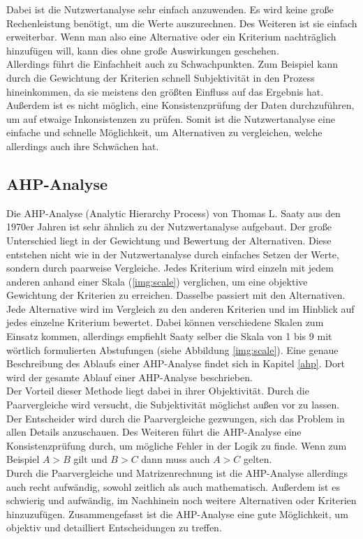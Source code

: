 Dabei ist die Nutzwertanalyse sehr einfach anzuwenden. Es wird keine große Rechenleistung benötigt, um die Werte auszurechnen. Des Weiteren ist sie einfach erweiterbar. Wenn man also eine Alternative oder ein Kriterium nachträglich hinzufügen will, kann dies ohne große Auswirkungen geschehen.\autocite[Vgl.][S.119]{Fink.2006}\\
Allerdings führt die Einfachheit auch zu Schwachpunkten. Zum Beispiel kann durch die Gewichtung der Kriterien schnell Subjektivität in den Prozess hineinkommen, da sie meistens den größten Einfluss auf das Ergebnis hat. Außerdem ist es nicht möglich, eine Konsistenzprüfung der Daten durchzuführen, um auf etwaige Inkonsistenzen zu prüfen.\autocite[Vgl.][S.119]{Fink.2006} Somit ist die Nutzwertanalyse eine einfache und schnelle Möglichkeit, um Alternativen zu vergleichen, welche allerdings auch ihre Schwächen hat. 
\subsection{AHP-Analyse}
Die AHP-Analyse (Analytic Hierarchy Process) von Thomas L. Saaty aus den 1970er Jahren ist sehr ähnlich zu der Nutzwertanalyse aufgebaut. Der große Unterschied liegt in der Gewichtung und Bewertung der Alternativen. Diese entstehen nicht wie in der Nutzwertanalyse durch einfaches Setzen der Werte, sondern durch paarweise Vergleiche.\autocite[Vgl.][S.9]{Mu.2018}  Jedes Kriterium wird einzeln mit jedem anderen anhand einer Skala (\ref{img:scale}) verglichen, um eine objektive Gewichtung der Kriterien zu erreichen. Dasselbe passiert mit den Alternativen. Jede Alternative wird im Vergleich zu den anderen Kriterien und im Hinblick auf jedes einzelne Kriterium bewertet. Dabei können verschiedene Skalen zum Einsatz kommen, allerdings empfiehlt Saaty selber die Skala von 1 bis 9 mit wörtlich formulierten Abstufungen (siehe Abbildung \ref{img:scale}). Eine genaue Beschreibung des Ablaufs einer AHP-Analyse findet sich in Kapitel \ref{ahp}. Dort wird der gesamte Ablauf einer AHP-Analyse beschrieben. \\Der Vorteil dieser Methode liegt dabei in ihrer Objektivität. Durch die Paarvergleiche wird versucht, die Subjektivität möglichst außen vor zu lassen. Der Entscheider wird durch die Paarvergleiche gezwungen, sich das Problem in allen Details anzuschauen. Des Weiteren führt die AHP-Analyse eine Konsistenzprüfung durch, um mögliche Fehler in der Logik zu finde.\autocite[Vgl.][S.119]{Fink.2006} Wenn zum Beispiel $A > B$ gilt und $B > C$ dann muss auch $A > C$ gelten.\\
Durch die Paarvergleiche und Matrizenrechnung ist die AHP-Analyse allerdings auch recht aufwändig,\autocite[Vgl.][S.119]{Fink.2006} sowohl zeitlich als auch mathematisch. Außerdem ist es schwierig und aufwändig, im Nachhinein noch weitere Alternativen oder Kriterien hinzuzufügen.\autocite[Vgl.][S.119]{Fink.2006}
Zusammengefasst ist die AHP-Analyse eine gute Möglichkeit, um objektiv und detailliert Entscheidungen zu treffen.
\\
